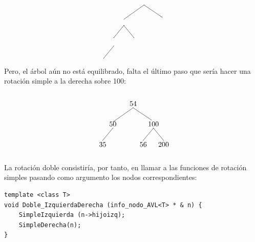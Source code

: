 \documentclass[10pt,a4paper,spanish]{report}
\begin{document}
\begin{description}
\[\begin{xy}
	\ar@{-} (0,-2);(-10,-9) %
	\ar@{-} (0,-2);(9,-8) %
	\ar@{-} (-10,-12);(-15,-18) %
	\ar@{-} (-15,-22);(-20,-28)
	\ar@{-} (-10,-12);(-5,-18) %
	\end{xy}\]

	\noindent
	Pero, el árbol aún no está equilibrado, falta el último paso que sería hacer una rotación simple a la derecha sobre 100:

	\[\begin{xy}
	,(0,0)*+=<10mm>[]\txt<2cm>{54}
	,(-10,-10)*+=<10mm>[]\txt<2cm>{50}
	,(10,-10)*+=<10mm>[]\txt<2cm>{100}
	,(-15,-20)*+=<10mm>[]\txt<2cm>{35}
	,(5,-20)*+=<10mm>[]\txt<2cm>{56}
	,(15,-20)*+=<10mm>[]\txt<2cm>{200}

	\ar@{-} (0,-2);(-10,-9) %
	\ar@{-} (0,-2);(9,-8) %
	\ar@{-} (-10,-12);(-15,-18) %
	\ar@{-} (10,-12);(5,-18) %
	\ar@{-} (10,-12);(15,-18) %
	\end{xy}\]

	\noindent
	La rotación doble consistiría, por tanto, en llamar a las funciones de rotación simples pasando como argumento los nodos correspondientes:

\begin{verbatim}
template <class T>
void Doble_IzquierdaDerecha (info_nodo_AVL<T> * & n) {
	SimpleIzquierda (n->hijoizq);
	SimpleDerecha(n);
}
\end{verbatim}


\end{description}
\end{document}
